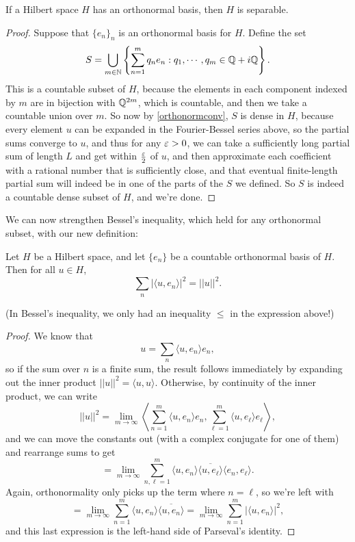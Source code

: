 \begin{corollary}
If a Hilbert space $H$ has an orthonormal basis, then $H$ is separable.
\end{corollary}
\begin{proof}
Suppose that $\{e_n\}_n$ is an orthonormal basis for $H$. Define the set 
\[
    S = \bigcup_{m \in \mathbb N} \left\{\sum_{n=1}^m q_n e_n: q_1, \cdots, q_m \in \mathbb Q + i \mathbb Q\right\}.
\]  
This is a countable subset of $H$, because the elements in each component indexed by $m$ are in bijection with $\mathbb Q^{2m}$, which is countable, and then we take a countable union over $m$. So now by \cref{orthonormconv}, $S$ is dense in $H$, because every element $u$ can be expanded in the Fourier-Bessel series above, so the partial sums converge to $u$, and thus for any $\varepsilon > 0$, we can take a sufficiently long partial sum of length $L$ and get within $\frac{\varepsilon}{2}$ of $u$, and then approximate each coefficient with a rational number that is sufficiently close, and that eventual finite-length partial sum will indeed be in one of the parts of the $S$ we defined. So $S$ is indeed a countable dense subset of $H$, and we're done.
\end{proof}

We can now strengthen Bessel's inequality, which held for any orthonormal subset, with our new definition:

\begin{theorem}
Let $H$ be a Hilbert space, and let $\{e_n\}$ be a countable orthonormal basis of $H$. Then for all $u \in H$,
\[
    \sum_{n} |\langle u, e_n \rangle|^2 = ||u||^2.
\]
\end{theorem}

(In Bessel's inequality, we only had an inequality $\le$ in the expression above!)

\begin{proof}
We know that 
\[
    u = \sum_n \langle u, e_n \rangle e_n,
\]
so if the sum over $n$ is a finite sum, the result follows immediately by expanding out the inner product $||u||^2 = \langle u, u \rangle$. Otherwise, by continuity of the inner product, we can write 
\[
    ||u||^2 = \lim_{m \to \infty} \left \langle \sum_{n=1}^m \langle u, e_n \rangle e_n , \sum_{\ell = 1}^m \langle u, e_\ell \rangle e_\ell \right\rangle,
\]
and we can move the constants out (with a complex conjugate for one of them) and rearrange sums to get 
\[
    = \lim_{m \to \infty} \sum_{n, \ell = 1}^m \langle u, e_n \rangle \overline{\langle u, e_\ell \rangle} \langle e_n, e_\ell \rangle.
\]
Again, orthonormality only picks up the term where $n = \ell$, so we're left with 
\[
    = \lim_{m \to \infty} \sum_{n=1}^m \langle u, e_n \rangle \overline{\langle u, e_n \rangle} = \lim_{ m \to \infty} \sum_{n=1}^m |\langle u, e_n \rangle|^2,
\]
and this last expression is the left-hand side of Parseval's identity.
\end{proof}

